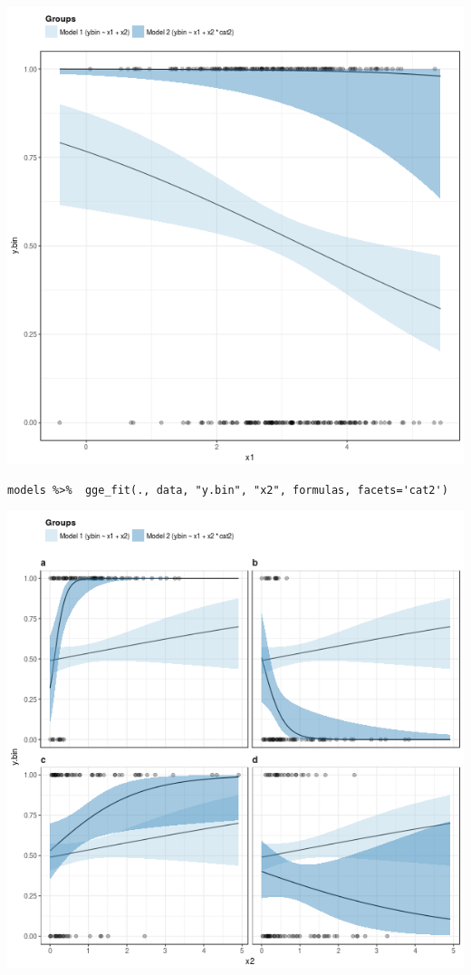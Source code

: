 \documentclass[a4paper]{article}
\begin{document}
\begin{enumerate}
\begin{center}
\includegraphics[width=.9\linewidth]{fig-fitted-many-models-bin.png}
\end{center}

\lstset{numbers=left,language=r,label= ,caption= ,captionpos=b}
\begin{lstlisting}
models %>%  gge_fit(., data, "y.bin", "x2", formulas, facets='cat2')

\end{lstlisting}

\begin{center}
\includegraphics[width=.9\linewidth]{fig-fitted-many-models-bin-2.png}
\end{center}
\end{enumerate}
\end{document}
